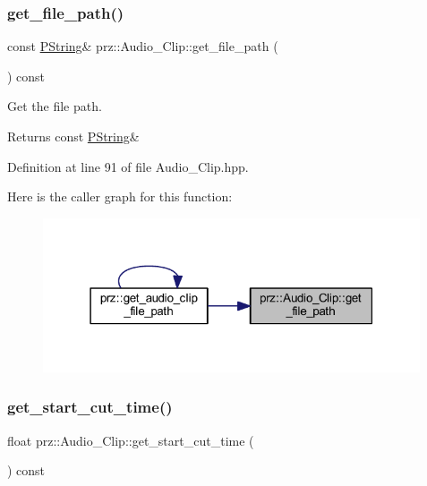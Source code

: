 \subsubsection{\texorpdfstring{get\_file\_path()}{get\_file\_path()}}
{\footnotesize\ttfamily const \mbox{\hyperlink{classprz_1_1_p_string}{P\+String}}\& prz\+::\+Audio\+\_\+\+Clip\+::get\+\_\+file\+\_\+path (\begin{DoxyParamCaption}{ }\end{DoxyParamCaption}) const\hspace{0.3cm}{\ttfamily [inline]}}



Get the file path. 

\begin{DoxyReturn}{Returns}
const \mbox{\hyperlink{classprz_1_1_p_string}{P\+String}}\& 
\end{DoxyReturn}


Definition at line 91 of file Audio\+\_\+\+Clip.\+hpp.

Here is the caller graph for this function\+:
\nopagebreak
\begin{figure}[H]
\begin{center}
\leavevmode
\includegraphics[width=316pt]{classprz_1_1_audio___clip_a06d95e1ba1b854e8f00b2ec3602d3c5f_icgraph}
\end{center}
\end{figure}
\mbox{\label{classprz_1_1_audio___clip_a0000a44ffec1e064301fd93750806aab}} 
\subsubsection{\texorpdfstring{get\_start\_cut\_time()}{get\_start\_cut\_time()}}
{\footnotesize\ttfamily float prz\+::\+Audio\+\_\+\+Clip\+::get\+\_\+start\+\_\+cut\+\_\+time (\begin{DoxyParamCaption}{ }\end{DoxyParamCaption}) const\hspace{0.3cm}{\ttfamily [inline]}}



